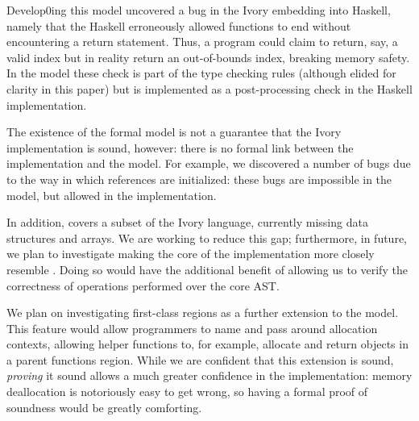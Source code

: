 Develop0ing this model uncovered a bug in the Ivory embedding into
Haskell, namely that the Haskell erroneously allowed functions to
end without encountering a return statement.  Thus, a program could
claim to return, say, a valid index but in reality return an
out-of-bounds index, breaking memory safety.  In the model these
check is part of the type checking rules (although elided for clarity
in this paper) but is implemented as a post-processing check in the
Haskell implementation.  

The existence of the formal model is not a guarantee that the Ivory
implementation is sound, however: there is no formal link between the
implementation and the model.  For example, we discovered a number of
bugs due to the way in which references are initialized: these bugs
are impossible in the model, but allowed in the implementation.  

In addition, \coreivory{} covers a subset of the Ivory language,
currently missing data structures and arrays.  We are working to
reduce this gap; furthermore, in future, we plan to investigate making
the core of the implementation more closely resemble \coreivory{}.
Doing so would have the additional benefit of allowing us to verify
the correctness of operations performed over the core AST.

We plan on investigating first-class regions as a further extension to
the model.  This feature would allow programmers to name and pass
around allocation contexts, allowing helper functions to, for example,
allocate and return objects in a parent functions region.  While we
are confident that this extension is sound, \emph{proving} it sound
allows a much greater confidence in the implementation: memory
deallocation is notoriously easy to get wrong, so having a formal
proof of soundness would be greatly comforting. 


